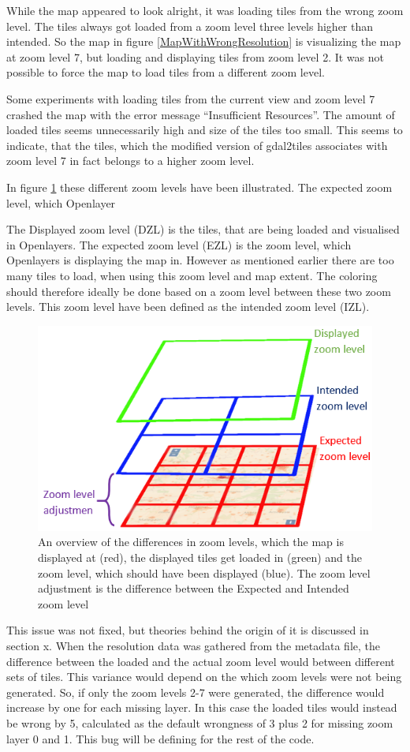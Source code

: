 While the map appeared to look alright, it was loading tiles from the wrong zoom level. The tiles always got loaded from a zoom level three levels higher than intended. So the map in figure \ref{MapWithWrongResolution} is visualizing the map at zoom level 7, but loading and displaying tiles from zoom level 2. It was not possible to force the map to load tiles from a different zoom level.

Some experiments with loading tiles from the current view and zoom level 7 crashed the map with the error message “Insufficient Resources”. The amount of loaded tiles seems unnecessarily high and size of the tiles too small. This seems to indicate, that the tiles, which the modified version of gdal2tiles associates with zoom level 7 in fact belongs to a higher zoom level.

In figure \ref{DifferentZoom} these different zoom levels have been illustrated. The expected zoom level, which Openlayer

The Displayed zoom level (DZL) is the tiles, that are being loaded and visualised in Openlayers. The expected zoom level (EZL) is the zoom level, which Openlayers is displaying the map in. However as mentioned earlier there are too many tiles to load, when using this zoom level and map extent. The coloring should therefore ideally be done based on a zoom level between these two zoom levels. This zoom level have been defined as the intended zoom level (IZL).

\begin{figure} [H]
	\centering
	\includegraphics[width=.6\textwidth]{Pictures/DifferentZoom}
	\caption{An overview of the differences in zoom levels, which the map is displayed at (red), the displayed tiles get loaded in (green) and the zoom level, which should have been displayed (blue). The zoom level adjustment is the difference between the Expected and Intended zoom level}
	\label{DifferentZoom}
\end{figure}
This issue was not fixed, but theories behind the origin of it is discussed in section x. When the resolution data was gathered from the metadata file, the difference between the loaded and the actual zoom level would between different sets of tiles. This variance would depend on the which zoom levels were not being generated. So, if only the zoom levels 2-7 were generated, the difference would increase by one for each missing layer. In this case the loaded tiles would instead be wrong by 5, calculated as the default wrongness of 3 plus 2 for missing zoom layer 0 and 1. 
This bug will be defining for the rest of the code.



